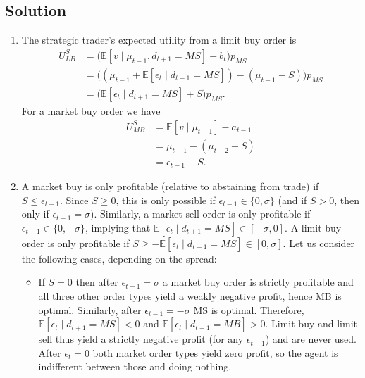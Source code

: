 \documentclass[a4paper]{article}
\newif\ifsolutions
\begin{document}
\ifsolutions
\subsection*{Solution}

\begin{enumerate}
	\item The strategic trader's expected utility from a limit buy order is
	\begin{align}
		U^S_{LB}
		&= \Big( \mathbb{E}[v \mid \mu_{t-1}, d_{t+1}=MS] - b_t \Big) p_{MS} 
		\nonumber
		\\
		&= \Big( (\mu_{t-1} + \mathbb{E}[\epsilon_{t} \mid d_{t+1}=MS]) - (\mu_{t-1} - S) \Big) p_{MS}
		\nonumber
		\\
		&= \Big( \mathbb{E}[\epsilon_{t} \mid d_{t+1}=MS] + S \Big) p_{MS}.
		\label{eq:uslb}
	\end{align}
	For a market buy order we have
	\begin{align}
		U^S_{MB}
		&= \mathbb{E}[v \mid \mu_{t-1}] - a_{t-1} 
		\nonumber
		\\
		&= \mu_{t-1} - (\mu_{t-2} + S)
		\nonumber
		\\
		&= \epsilon_{t-1} - S.
		\label{eq:usmb}
	\end{align}
	
	\item A market buy is only profitable (relative to abstaining from trade) if $S \leq \epsilon_{t-1}$. Since $S \geq 0$, this is only possible if $\epsilon_{t-1} \in \{0,\sigma\}$ (and if $S>0$, then only if $\epsilon_{t-1}=\sigma$). Similarly, a market sell order is only profitable if $\epsilon_{t-1} \in \{0,-\sigma\}$, implying that $\mathbb{E}[\epsilon_{t} \mid d_{t+1}=MS] \in [-\sigma,0]$. A limit buy order is only profitable if $S \geq - \mathbb{E}[\epsilon_{t} \mid d_{t+1}=MS] \in [0,\sigma]$. Let us consider the following cases, depending on the spread:
	\begin{itemize}
		\item If $S=0$ then after $\epsilon_{t-1}=\sigma$ a market buy order is strictly profitable and all three other order types yield a weakly negative profit, hence MB is optimal. Similarly, after  $\epsilon_{t-1}=-\sigma$ MS is optimal. Therefore, $\mathbb{E}[\epsilon_{t} \mid d_{t+1}=MS] < 0$ and $\mathbb{E}[\epsilon_{t} \mid d_{t+1}=MB] > 0$. Limit buy and limit sell thus yield a strictly negative profit (for any $\epsilon_{t-1}$) and are never used. After $\epsilon_{t}=0$ both market order types yield zero profit, so the agent is indifferent between those and doing nothing.
		

\end{itemize}
\end{enumerate}
\end{document}
